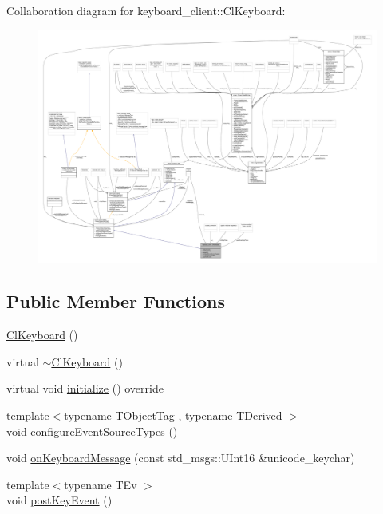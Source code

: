 Collaboration diagram for keyboard\+\_\+client\+:\+:Cl\+Keyboard\+:\nopagebreak
\begin{figure}[H]
\begin{center}
\leavevmode
\includegraphics[width=350pt]{classkeyboard__client_1_1ClKeyboard__coll__graph}
\end{center}
\end{figure}
\subsection*{Public Member Functions}
\begin{DoxyCompactItemize}
\item 
\hyperlink{classkeyboard__client_1_1ClKeyboard_a4da263c77c076b959c4c21160af1bcb5}{Cl\+Keyboard} ()
\item 
virtual \hyperlink{classkeyboard__client_1_1ClKeyboard_a0e9bfb4a0e564e26f57248a78a78d087}{$\sim$\+Cl\+Keyboard} ()
\item 
virtual void \hyperlink{classkeyboard__client_1_1ClKeyboard_a7ac4502969c62b0c836b531cec05f8ed}{initialize} () override
\item 
{\footnotesize template$<$typename T\+Object\+Tag , typename T\+Derived $>$ }\\void \hyperlink{classkeyboard__client_1_1ClKeyboard_a9643ea9235ee12d054c87f79fbf31211}{configure\+Event\+Source\+Types} ()
\item 
void \hyperlink{classkeyboard__client_1_1ClKeyboard_adbfb9c2b98f784b12cf7740b4e861d8e}{on\+Keyboard\+Message} (const std\+\_\+msgs\+::\+U\+Int16 \&unicode\+\_\+keychar)
\item 
{\footnotesize template$<$typename T\+Ev $>$ }\\void \hyperlink{classkeyboard__client_1_1ClKeyboard_ad62d3548adfeca7f31469a283454dbeb}{post\+Key\+Event} ()
\end{DoxyCompactItemize}
